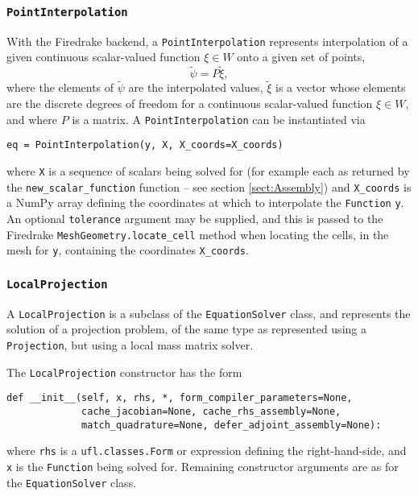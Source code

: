 \documentclass[11pt]{article}
\begin{document}
\subsubsection{\texttt{PointInterpolation}}

With the Firedrake backend, a \texttt{PointInterpolation} represents
interpolation of a given continuous scalar-valued function $\xi \in W$ onto a
given set of points,
\begin{equation*}
  \tilde{\psi} = P \tilde{\xi},
\end{equation*}
where the elements of $\tilde{\psi}$ are the interpolated values, $\tilde{\xi}$
is a vector whose elements are the discrete degrees of freedom for a continuous
scalar-valued function $\xi \in W$, and where $P$ is a matrix. A
\texttt{PointInterpolation} can be instantiated via
\begin{lstlisting}
eq = PointInterpolation(y, X, X_coords=X_coords)
\end{lstlisting}
where \texttt{X} is a sequence of scalars being solved for (for example each as
returned by the \texttt{new\_scalar\_function} function -- see section
\ref{sect:Assembly}) and \texttt{X\_coords} is a NumPy array defining the
coordinates at which to interpolate the \texttt{Function} \texttt{y}. An
optional \texttt{tolerance} argument may be supplied, and this is passed to the
Firedrake \texttt{MeshGeometry.locate\_cell} method when locating the cells, in
the mesh for \texttt{y}, containing the coordinates \texttt{X\_coords}.

\subsubsection{\texttt{LocalProjection}}

A \texttt{LocalProjection} is a subclass of the \texttt{EquationSolver} class,
and represents the solution of a projection problem, of the same type as
represented using a \texttt{Projection}, but using a local mass matrix solver.

The \texttt{LocalProjection} constructor has the form
\begin{lstlisting}
def __init__(self, x, rhs, *, form_compiler_parameters=None,
             cache_jacobian=None, cache_rhs_assembly=None,
             match_quadrature=None, defer_adjoint_assembly=None):
\end{lstlisting}
where \texttt{rhs} is a \texttt{ufl.classes.Form} or expression defining
the right-hand-side, and \texttt{x} is the \texttt{Function} being solved for.
Remaining constructor arguments are as for the \texttt{EquationSolver} class.
\end{document}
